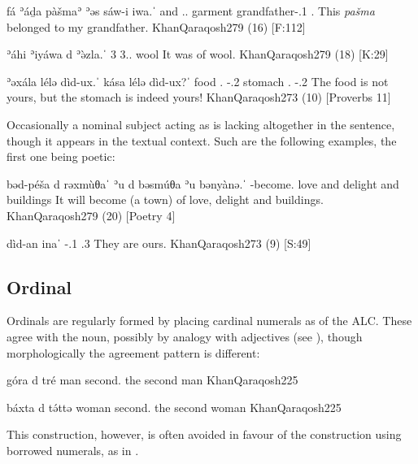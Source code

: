 {fá ʾáḏa pàšmaʾ \zero{} ʾəs\cb{} sáw-i \cb{}iwa.ˈ}
{and \dem.\near.\masc{} garment \zero{} \lnk\cb{} grandfather-\poss.1\sg{} \cb{}\cop.\pst}
{This \textit{pašma} belonged to my grandfather.}
{KhanQaraqosh}{279 (16) {[F:112]}}

{ʾáhi ʾiyáwa \zero{} d\cb{} ʾə̀zla.ˈ}
{3\fem{} 3\fem.\cop.\pst{} \zero{} \lnk\cb{} wool}
{It was of wool.}
{KhanQaraqosh}{279 (18) {[K:29]}}

{ʾəxála lélə \zero{} dìd-ux.ˈ kása lélə \zero{} dìd-ux?ˈ}
{food \neg.\cop{} \zero{} \lnk-\poss.2\masc{} stomach \neg.\cop{} \zero{} \lnk-\poss.2\masc{}}
{The food is not yours, but the stomach is indeed yours!}
{KhanQaraqosh}{273 (10) {[Proverbs 11]}}

\largerpage
Occasionally a nominal subject acting as \prim is lacking altogether in the sentence, though it appears in the textual context. Such are the following examples, the first one being poetic:

{bəd-péša \zero{} d\cb{} rəxmùθaˈ ʾu\cb{} \zero{} d\cb{} bəsmúθa ʾu\cb{} bənyànə.ˈ}
{\fut-become.\fem{}	\zero{} \lnk\cb{} love and\cb{} \zero{} \lnk\cb{} delight and\cb{} buildings}
{It will become (a town) of love, delight and buildings.}
{KhanQaraqosh}{279 (20) {[Poetry 4]}}

{\zero{} dìd-an \cb{}inaˈ}
{\zero{} \lnk-\poss.1\pl{} \cb{}\cop.3\pl}
{They are ours.}
{KhanQaraqosh}{273 (9) {[S:49]}}\antipar




\subsection{Ordinal \secns}

Ordinals are regularly formed by placing cardinal numerals as \secns of the ALC. These agree with the \prim noun, possibly by analogy with adjectives (see ), though morphologically the agreement pattern is different:

{góra d\cb{}  tré}
{man \lnk\cb{}  second.\masc{}}
{the second man}
{KhanQaraqosh}{225}

{báxta d\cb{}  tə́ttə}
{woman \lnk\cb{}  second.\fem}
{the second woman}
{KhanQaraqosh}{225}

This construction, however, is often avoided in favour of the construction using borrowed  numerals,  as in .




